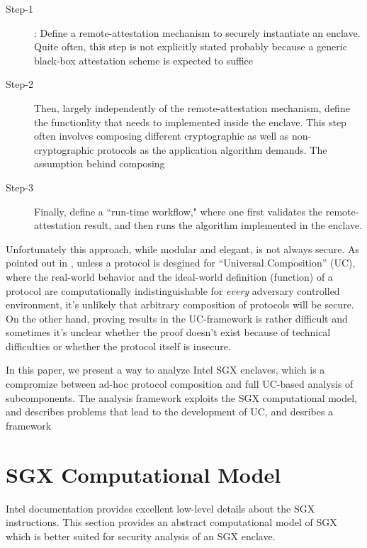 \documentclass[11pt]{article}
\newcommand{\uc}{\textsf{UC}}
\begin{document}
  \begin{description}
    \item[Step-1]: Define a remote-attestation mechanism to securely 
      instantiate an enclave. Quite often, this step is not explicitly 
      stated probably because a generic black-box attestation scheme
      is expected to suffice
    \item[Step-2] Then, largely independently of the remote-attestation 
      mechanism, define the functionlity that needs to implemented 
      inside the enclave. This step often involves composing different 
      cryptographic as well as non-cryptographic protocols as the 
      application algorithm demands. The assumption behind composing  
    \item[Step-3] Finally, define a ``run-time workflow," where one first
      validates the remote-attestation result, and then runs the algorithm
      implemented in the enclave.
  \end{description}

  Unfortunately this approach, while modular and elegant, is not always 
  secure. As pointed out in \cite{ucframework}, unless a protocol
  is desgined for ``\textsf{Universal Composition}'' (\uc), where the 
  real-world behavior and the ideal-world definition (function) of a 
  protocol are computationally indistinguishable for 
  \textit{every} adversary controlled environment, it's unlikely 
  that arbitrary composition of protocols will be secure. On the other 
  hand, proving results in the \uc-framework is rather difficult and 
  sometimes it's unclear whether the proof doesn't exist because of 
  technical difficulties or whether the protocol itself is insecure. 

  In this paper, we present a way to analyze Intel SGX enclaves, which is
  a compromize between ad-hoc protocol composition and full \uc-based 
  analysis of subcomponents. The analysis framework exploits the SGX 
  computational model, and describes problems that lead to the development
  of \uc, and desribes a framework 

  \section{SGX Computational Model}
  \label{sec:model}
  Intel documentation\cite{intelsdm} provides excellent low-level
  details about the SGX instructions. This section provides an
  abstract computational model of SGX which is better suited for
  security analysis of an SGX enclave.
\end{document}
